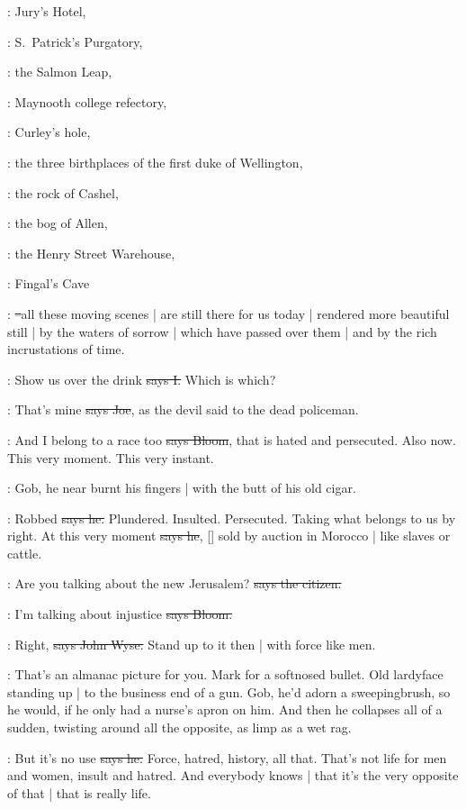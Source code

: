 :
Jury's Hotel,

:
S.~Patrick's Purgatory,

:
the Salmon Leap,

:
Maynooth college refectory,

:
Curley's hole,

:
the three birthplaces of the first duke of Wellington,

:
the rock of Cashel,

:
the bog of Allen,

:
the Henry Street Warehouse,

:
Fingal's Cave

:
\sout{--}all these moving scenes |
are still there for us today |
rendered more beautiful still |
by the waters of sorrow |
which have passed over them |
and by the rich incrustations of time.

:
Show us over the drink
\sout{says I.}
Which is which?

\joe:
That's mine
\sout{says Joe},
as the devil said to the dead policeman.

\Bloom:
And I belong to a race too
\sout{says Bloom},
that is hated and persecuted.
Also now.
This very moment.
This very instant.

\Nq:
Gob,
he near burnt his fingers |
with the butt of his old cigar.

\Bloom:
Robbed
\sout{says he.}
Plundered.
Insulted.
Persecuted.
Taking what belongs to us by right.
At this very moment
\sout{says he},
[]
sold by auction in Morocco |
like slaves or cattle.

\citizen:
Are you talking about the new Jerusalem?
\sout{says the citizen.}

\Bloom:
I'm talking about injustice
\sout{says Bloom.}

\johnwyse:
Right,
\sout{says John Wyse.}
Stand up to it then |
with force like men.

\Nq:
That's an almanac picture for you.
Mark for a softnosed bullet.
Old lardyface standing up |
to the business end of a gun.
Gob,
he'd adorn a sweepingbrush,
so he would,
if he only had a nurse's apron on him.
And then he collapses all of a sudden,
twisting around all the opposite,
as limp as a wet rag.%

\Bloom:
But it's no use
\sout{says he.}
Force,
hatred,
history,
all that.
That's not life for men and women,
insult and hatred.
And everybody knows |
that it's the very opposite of that |
that is really life.

